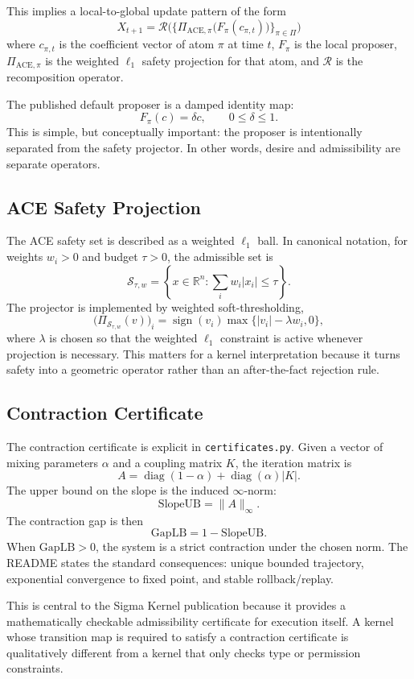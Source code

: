 \documentclass[11pt]{article}
\begin{document}
This implies a local-to-global update pattern of the form
\[
X_{t+1} = \mathcal{R}\Big( \big\{ \Pi_{\mathrm{ACE},\pi}\big(F_\pi(c_{\pi,t})\big) \big\}_{\pi \in \Pi} \Big)
\]
where $c_{\pi,t}$ is the coefficient vector of atom $\pi$ at time $t$, $F_\pi$ is the local proposer, $\Pi_{\mathrm{ACE},\pi}$ is the weighted $\ell_1$ safety projection for that atom, and $\mathcal{R}$ is the recomposition operator.

The published default proposer is a damped identity map:
\[
F_\pi(c) = \delta c, \qquad 0 \leq \delta \leq 1.
\]
This is simple, but conceptually important: the proposer is intentionally separated from the safety projector. In other words, desire and admissibility are separate operators.

\subsection{ACE Safety Projection}
The ACE safety set is described as a weighted $\ell_1$ ball. In canonical notation, for weights $w_i > 0$ and budget $\tau > 0$, the admissible set is
\[
\mathcal{S}_{\tau,w} = \left\{x \in \mathbb{R}^n : \sum_i w_i |x_i| \leq \tau \right\}.
\]
The projector is implemented by weighted soft-thresholding,
\[
\big(\Pi_{\mathcal{S}_{\tau,w}}(v)\big)_i = \operatorname{sign}(v_i)\max\{ |v_i| - \lambda w_i, 0\},
\]
where $\lambda$ is chosen so that the weighted $\ell_1$ constraint is active whenever projection is necessary. This matters for a kernel interpretation because it turns safety into a geometric operator rather than an after-the-fact rejection rule.

\subsection{Contraction Certificate}
The contraction certificate is explicit in \texttt{certificates.py}. Given a vector of mixing parameters $\alpha$ and a coupling matrix $K$, the iteration matrix is
\[
A = \operatorname{diag}(1-\alpha) + \operatorname{diag}(\alpha)|K|.
\]
The upper bound on the slope is the induced $\infty$-norm:
\[
\mathrm{SlopeUB} = \|A\|_\infty.
\]
The contraction gap is then
\[
\mathrm{GapLB} = 1 - \mathrm{SlopeUB}.
\]
When $\mathrm{GapLB} > 0$, the system is a strict contraction under the chosen norm. The README states the standard consequences: unique bounded trajectory, exponential convergence to fixed point, and stable rollback/replay.

This is central to the Sigma Kernel publication because it provides a mathematically checkable admissibility certificate for execution itself. A kernel whose transition map is required to satisfy a contraction certificate is qualitatively different from a kernel that only checks type or permission constraints.
\end{document}
